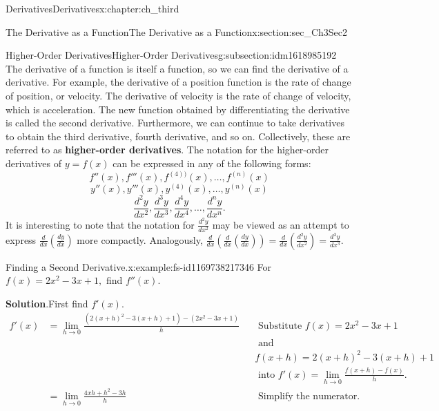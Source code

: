 \documentclass[oneside,10pt,]{book}
\newcommand{\blocktitlefont}{\relax}
\newcommand{\terminology}[1]{\textbf{#1}}
\numberwithin{equation}{section}
\newcommand{\amp}{&}
\begin{document}
\begin{chapterptx}{Derivatives}{}{Derivatives}{}{}{x:chapter:ch_third}
\begin{sectionptx}{The Derivative as a Function}{}{The Derivative as a Function}{}{}{x:section:sec_Ch3Sec2}
%
%
\typeout{************************************************}
\typeout{************************************************}
%
\begin{subsectionptx}{Higher-Order Derivatives}{}{Higher-Order Derivatives}{}{}{g:subsection:idm1618985192}
The derivative of a function is itself a function, so we can find the derivative of a derivative. For example, the derivative of a position function is the rate of change of position, or velocity. The derivative of velocity is the rate of change of velocity, which is acceleration. The new function obtained by differentiating the derivative is called the second derivative. Furthermore, we can continue to take derivatives to obtain the third derivative, fourth derivative, and so on. Collectively, these are referred to as \terminology{higher-order derivatives}. The notation for the higher-order derivatives of \(y=f(x)\) can be expressed in any of the following forms:%
%
\begin{equation*}
f''(x), f'''(x),f^{(4))}(x),\dots,f^{(n)}(x)
\end{equation*}
%
\begin{equation*}
y''(x),y'''(x),y^{(4)}(x), \dots ,y^{(n)}(x)
\end{equation*}
%
\begin{equation*}
\frac{d^2y}{dx^2},\frac{d^3y}{dx^3},\frac{d^4y}{dx^4},\dots,\frac{d^ny}{dx^n}.
\end{equation*}
It is interesting to note that the notation for \(\frac{d^2y}{dx^2}\) may be viewed as an attempt to express \(\frac{d}{dx}(\frac{dy}{dx})\) more compactly. Analogously, \(\frac{d}{dx}(\frac{d}{dx}(\frac{dy}{dx}))=\frac{d}{dx}(\frac{d^2y}{dx^2})=\frac{d^3y}{dx^3}.\)%
\begin{example}{Finding a Second Derivative.}{x:example:fs-id1169738217346}%
For \(f(x)=2x^2-3x+1,\) find \(f''(x).\)%
\par\smallskip%
\noindent\textbf{\blocktitlefont Solution}.\hypertarget{g:solution:idm1618981352}{}\quad{}First find \(f'(x).\)%
%
\begin{align*}
f'(x)\amp=\lim_{h\to 0}\frac{(2(x+h)^2-3(x+h)+1)-(2x^2-3x+1)}{h}\amp\amp\text{ Substitute } f(x)=2x^2-3x+1\\
\amp \amp \amp \text{ and }\\
\amp \amp \amp f(x+h)=2(x+h)^2-3(x+h)+1\\
\amp \amp \amp \text{ into } f'(x)=\lim_{h\to 0}\frac{f(x+h)-f(x)}{h}.\\
\amp =\lim_{h\to 0}\frac{4xh+h^2-3h}{h}\amp\amp\text{ Simplify the numerator. }\\

\end{align*}
\end{example}
\end{subsectionptx}
\end{sectionptx}
\end{chapterptx}
\end{document}
